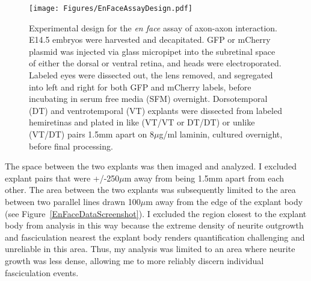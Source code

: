 \begin{figure}[hbtp]
    \begin{center}
        \texttt{[image: Figures/EnFaceAssayDesign.pdf]}
        \caption[Experimental design for the \emph{en face} assay of axon-axon interaction.]
        {Experimental design for the \emph{en face} assay of axon-axon interaction.
        E14.5 embryos were harvested and decapitated.
        GFP or mCherry plasmid was injected via glass micropipet into the subretinal space of either the dorsal or ventral retina, and heads were electroporated.
        Labeled eyes were dissected out, the lens removed, and segregated into left and right for both GFP and mCherry labels, before incubating in serum free media (SFM) overnight.
        Dorsotemporal (DT) and ventrotemporal (VT) explants were dissected from labeled hemiretinas and plated in like (VT/VT or DT/DT) or unlike (VT/DT) pairs 1.5mm apart on 8$\mu$g/ml laminin, cultured overnight, before final processing.
        }
        \label{Figures/EnFaceAssayDesign}
    \end{center}
\end{figure}
The space between the two explants was then imaged and analyzed.
I excluded explant pairs that were +/-250$\mu$m away from being 1.5mm apart from each other.
The area between the two explants was subsequently limited to the area between two parallel lines drawn 100$\mu$m away from the edge of the explant body (see Figure~\ref{EnFaceDataScreenshot}).
I excluded the region closest to the explant body from analysis in this way because the extreme density of neurite outgrowth and fasciculation nearest the explant body renders quantification challenging and unreliable in this area.
Thus, my analysis was limited to an area where neurite growth was less dense, allowing me to more reliably discern individual fasciculation events.
